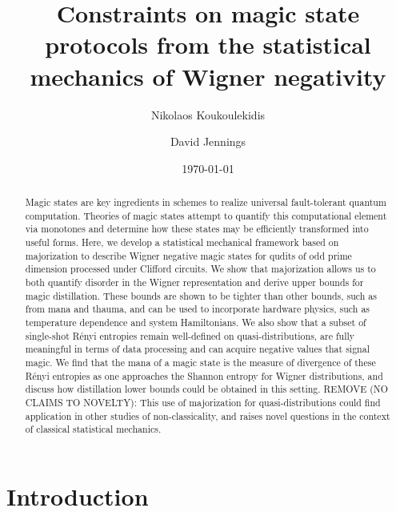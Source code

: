 \documentclass[
onecolumn,
superscriptaddress
]{revtex4-1}
\newcommand{\revhigh}[1]{{\color{red}#1}}
\begin{document}
\begin{abstract}
Magic states are key ingredients in schemes to realize universal fault-tolerant quantum computation.
Theories of magic states attempt to quantify this computational element via monotones and determine how these states may be efficiently transformed into useful forms. Here, we develop a statistical mechanical framework based on majorization to describe Wigner negative magic states for qudits of odd prime dimension processed under Clifford circuits. We show that majorization allows us to both quantify disorder in the Wigner representation and derive upper bounds for magic distillation. These bounds are shown to be tighter than other bounds, such as from mana and thauma, and can be used to incorporate hardware physics, such as temperature dependence and system Hamiltonians. We also show that a subset of single-shot R\'{e}nyi entropies remain well-defined on quasi-distributions, are fully meaningful in terms of data processing and can acquire negative values that signal magic. We find that the mana of a magic state is the measure of divergence of these R\'{e}nyi entropies as one approaches the Shannon entropy for Wigner distributions, and discuss how distillation lower bounds could be obtained in this setting. \revhigh{REMOVE (NO CLAIMS TO NOVELTY): This use of majorization for quasi-distributions could find application in other studies of non-classicality, and raises novel questions in the context of classical statistical mechanics.}
\end{abstract}


\title{Constraints on magic state protocols from the statistical mechanics of Wigner negativity}

\author{Nikolaos Koukoulekidis}
\author{David Jennings}

\date{\today}
\maketitle

\section*{Introduction}
\end{document}
